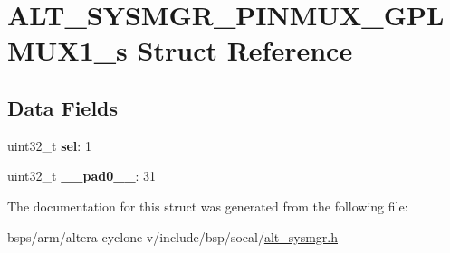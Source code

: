 \hypertarget{structALT__SYSMGR__PINMUX__GPLMUX1__s}{}\section{A\+L\+T\+\_\+\+S\+Y\+S\+M\+G\+R\+\_\+\+P\+I\+N\+M\+U\+X\+\_\+\+G\+P\+L\+M\+U\+X1\+\_\+s Struct Reference}
\label{structALT__SYSMGR__PINMUX__GPLMUX1__s}
\subsection*{Data Fields}
\begin{DoxyCompactItemize}
\item 
\mbox{\label{structALT__SYSMGR__PINMUX__GPLMUX1__s_a9ab756be24923fc7591e9ef2cc80f9ab}} 
uint32\+\_\+t {\bfseries sel}\+: 1
\item 
\mbox{\label{structALT__SYSMGR__PINMUX__GPLMUX1__s_a2a45e72bbb6a505f64c2209f447d7a9e}} 
uint32\+\_\+t {\bfseries \+\_\+\+\_\+pad0\+\_\+\+\_\+}\+: 31
\end{DoxyCompactItemize}


The documentation for this struct was generated from the following file\+:\begin{DoxyCompactItemize}
\item 
bsps/arm/altera-\/cyclone-\/v/include/bsp/socal/\mbox{\hyperlink{alt__sysmgr_8h}{alt\+\_\+sysmgr.\+h}}\end{DoxyCompactItemize}
